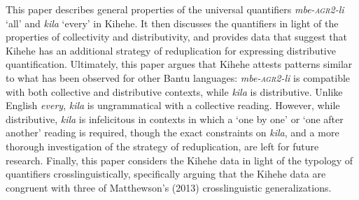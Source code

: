 \documentclass[letterpaper, 12pt]{article}
\begin{document}
This paper describes general properties of the universal quantifiers \textit{mbe-\textsc{agr2}-li} `all' and \textit{kila} `every' in Kihehe. It then discusses the quantifiers in light of the properties of collectivity and distributivity, and provides data that suggest that Kihehe has an additional strategy of reduplication for expressing distributive quantification. Ultimately, this paper argues that Kihehe attests patterns similar to what has been observed for other Bantu languages: \textit{mbe-\textsc{agr2}-li} is compatible with both collective and distributive contexts, while \textit{kila} is distributive. Unlike English \textit{every}, \textit{kila} is ungrammatical with a collective reading. However, while distributive, \textit{kila} is infelicitous in contexts in which a `one by one' or `one after another' reading is required, though the exact constraints on \textit{kila}, and a more thorough investigation of the strategy of reduplication, are left for future research. Finally, this paper considers the Kihehe data in light of the typology of quantifiers crosslinguistically, specifically arguing that the Kihehe data are congruent with three of Matthewson's (2013) crosslinguistic generalizations. 

% 
\end{document}
